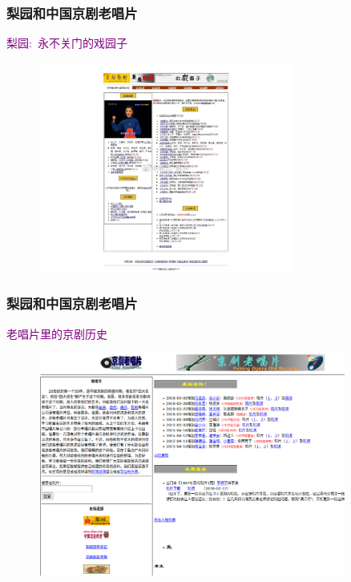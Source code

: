 \documentclass[cjk,slidestop,compress,mathserif,blue]{beamer}
\begin{document}
\frame
{
	\frametitle{梨园和中国京剧老唱片}
	\textcolor{purple}{梨园:~永不关门的戏园子}
\begin{figure}[h!]
\centering
\vspace{-0.05in}
\includegraphics[height=0.65\textwidth,width=0.75\textwidth,clip]{Figures/PekOpe_Liyuan.jpg}
\label{Liyuan}
\end{figure}
}

\frame
{
	\frametitle{梨园和中国京剧老唱片}
	\textcolor{purple}{老唱片里的京剧历史}
\begin{figure}[h!]
\centering
\vspace{-0.05in}
\includegraphics[height=0.65\textwidth,width=0.90\textwidth,clip]{Figures/PekOpe_Oldrec.png}
\label{Oldrecord}
\end{figure}
}
\end{document}
